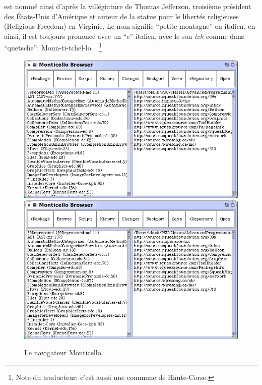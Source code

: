 \documentclass[a4paper,10pt,twoside]{book}
\begin{document}
 est nomm\'e ainsi d'apr\`es la vill\'egiature 
de Thomas Jefferson, troisi\`eme pr\'esident des \'Etats-Unis d'Am\'erique
et auteur de la statue pour le libert\'es religieuses (Religious Freedom) en
Virginie. Le nom signifie ``petite montagne'' en italien, en ainsi, il est
toujours prononc\'e avec un ``c'' italien, \ie avec le son \emph{tch} comme
dans ``quetsche'':
Monn-ti-tchel-lo.
~\footnote{Note du traducteur: c'est aussi une commune de Haute-Corse.}

\begin{figure}[btp]
	\begin{center}
	\ifluluelse
		{\includegraphics[width=\textwidth]{freshMonticello}}
		{\includegraphics[scale=0.7]{freshMonticello}}
	\end{center}
	\caption{Le navigateur Monticello.}
	\label{fig:freshMonticello}
\end{figure}
\end{document}
